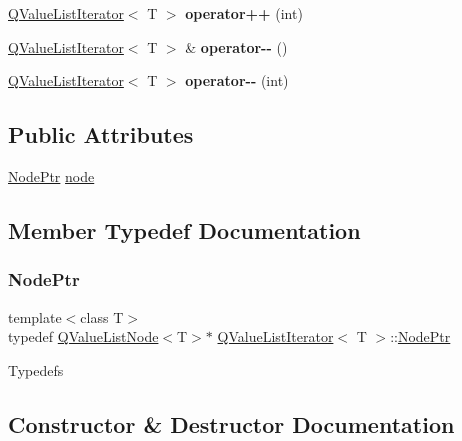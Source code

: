 \begin{DoxyCompactItemize}
\mbox{\hyperlink{class_q_value_list_iterator}{Q\+Value\+List\+Iterator}}$<$ T $>$ {\bfseries operator++} (int)
\item 
\mbox{\label{class_q_value_list_iterator_a41feb1058f0098416ec83c7a6bcd019b}} 
\mbox{\hyperlink{class_q_value_list_iterator}{Q\+Value\+List\+Iterator}}$<$ T $>$ \& {\bfseries operator-\/-\/} ()
\item 
\mbox{\label{class_q_value_list_iterator_ab9d27d1e7b824abfb485ac85ac7c5f85}} 
\mbox{\hyperlink{class_q_value_list_iterator}{Q\+Value\+List\+Iterator}}$<$ T $>$ {\bfseries operator-\/-\/} (int)
\end{DoxyCompactItemize}
\subsection*{Public Attributes}
\begin{DoxyCompactItemize}
\item 
\mbox{\hyperlink{class_q_value_list_iterator_abf409d04d86ddd5977132fecb2e6db61}{Node\+Ptr}} \mbox{\hyperlink{class_q_value_list_iterator_aec667067d973ccc7258b5d898f89fffe}{node}}
\end{DoxyCompactItemize}


\subsection{Member Typedef Documentation}
\mbox{\label{class_q_value_list_iterator_abf409d04d86ddd5977132fecb2e6db61}} 
\subsubsection{\texorpdfstring{NodePtr}{NodePtr}}
{\footnotesize\ttfamily template$<$class T$>$ \\
typedef \mbox{\hyperlink{class_q_value_list_node}{Q\+Value\+List\+Node}}$<$T$>$$\ast$ \mbox{\hyperlink{class_q_value_list_iterator}{Q\+Value\+List\+Iterator}}$<$ T $>$\+::\mbox{\hyperlink{class_q_value_list_iterator_abf409d04d86ddd5977132fecb2e6db61}{Node\+Ptr}}}

Typedefs 

\subsection{Constructor \& Destructor Documentation}
\mbox{\label{class_q_value_list_iterator_adc014e4e90024a0a1eb42a93247de28f}} 
